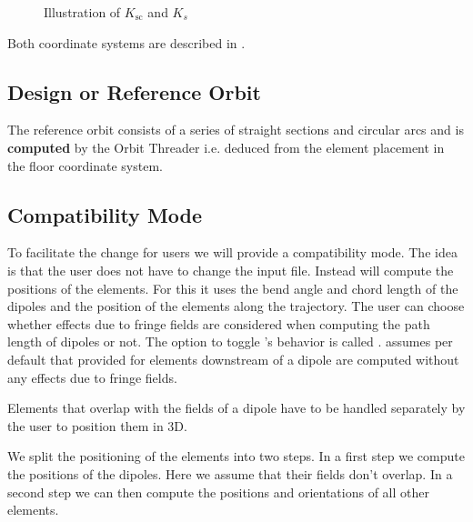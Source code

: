 \begin{figure}[!htb]
\begin{center}
  \caption{Illustration of $K_\text{sc}$ and $K_s$}
  \label{fig:KS2}
\end{center}
\end{figure}
Both coordinate systems are described in .

\subsection{Design or Reference Orbit}
The reference orbit consists of a series of straight sections and circular arcs and is {\bf computed} by the Orbit Threader i.e. deduced from the element placement in the floor coordinate system.

\subsection{Compatibility Mode}
To facilitate the change for users we will provide a compatibility mode. The idea is that the user does not have to change the input file. Instead \opalt will compute the positions of the elements. For this it uses the bend angle and chord length of the dipoles and the position of the elements along the trajectory. The user can choose whether effects due to fringe fields are considered when computing the path length of dipoles or not. The option to toggle \opalt's behavior is called . \opalt assumes per default that provided  for elements downstream of a dipole are computed without any effects due to fringe fields.

Elements that overlap with the fields of a dipole have to be handled separately by the user to position them in 3D.

We split the positioning of the elements into two steps. In a first step we compute the positions of the dipoles. Here we assume that their fields don't overlap. In a second step we can then compute the positions and orientations of all other elements.

